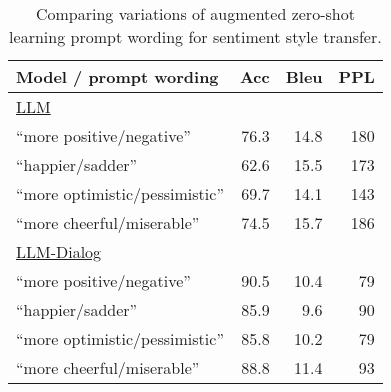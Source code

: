 \begin{table}[ht]
\caption{Comparing variations of augmented zero-shot learning prompt wording for sentiment style transfer.}
\label{tab:compare-between-prompts}
    \centering \small 
    \begin{tabular}{lrrr}
    \toprule
    Model / prompt wording &Acc&Bleu&PPL \\
    \midrule
    \underline{LLM}&&&\\
    ``more {positive/negative}''&76.3&14.8&180\\
    ``{happier/sadder}''&62.6&15.5&173\\
    ``more {optimistic/pessimistic}''&69.7&14.1&143\\
    ``more {cheerful/miserable}''&74.5&15.7&186\\
    \midrule
    \underline{LLM-Dialog}&&&\\
    ``more {positive/negative}''&90.5&10.4&79 \\
    ``{happier/sadder}''&85.9&9.6&90 \\
    ``more {optimistic/pessimistic}''&85.8&10.2&79 \\
    ``more {cheerful/miserable}''&88.8&11.4&93 \\
    \bottomrule
    \end{tabular}
\end{table}